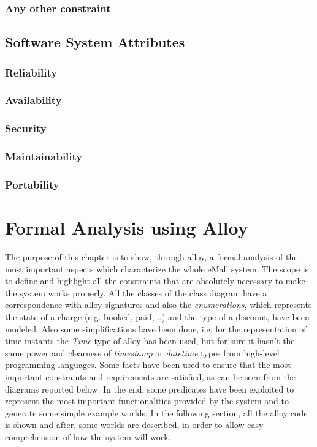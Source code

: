 \documentclass[a4paper]{report}
\begin{document}
\subsection{Any other constraint}

\section{Software System Attributes}
\subsection{Reliability}
\subsection{Availability}
\subsection{Security}
\subsection{Maintainability}
\subsection{Portability}

\chapter{Formal Analysis using Alloy}
The purpose of this chapter is to show, through alloy, a formal analysis of the most important aspects which characterize the whole eMall system. The scope is to define and highlight all the constraints that are absolutely necessary to make the system works properly. All the classes of the class diagram have a correspondence with alloy signatures and also the \textit{enumerations}, which represents the state of a charge (e.g. booked, paid, ..) and the type of a discount, have been modeled. Also some simplifications have been done, i.e. for the representation of time instants the \textit{Time} type of alloy has been used, but for sure it hasn't the same power and clearness of \textit{timestamp} or \textit{datetime} types from high-level programming languages. Some facts have been used to ensure that the most important constraints and requirements are satisfied, as can be seen from the diagrams reported below. In the end, some predicates have been exploited to represent the most important functionalities provided by the system and to generate some simple example worlds. In the following section, all the alloy code is shown and after, some worlds are described, in order to allow easy comprehension of how the system will work.
\end{document}
